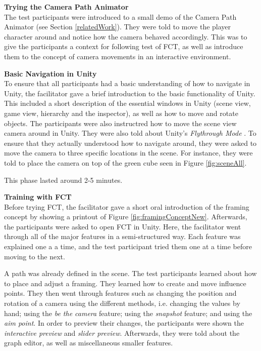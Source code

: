 \textbf{Trying the Camera Path Animator}\\
The test participants were introduced to a small demo of the Camera Path Animator \cite{unity_camTool} (see Section \ref{relatedWork}). They were told to move the player character around and notice how the camera behaved accordingly. This was to give the participants a context for following test of FCT, as well as introduce them to the concept of camera movements in an interactive environment.




\textbf{Basic Navigation in Unity}\\
To ensure that all participants had a basic understanding of how to navigate in Unity, the facilitator gave a brief introduction to the basic functionality of Unity. This included a short description of the essential windows in Unity (scene view, game view, hierarchy and the inspector), as well as how to move and rotate objects. The participants were also instructred how to move the scene view camera around in Unity. They were also told about Unity's \textit{Flythrough Mode} \cite{unity_flyMode}. To ensure that they actually understood how to navigate around, they were asked to move the camera to three specific locations in the scene. For instance, they were told to place the camera on top of the green cube seen in Figure \ref{fig:sceneAll}.

This phase lasted around 2-5 minutes.

\textbf{Training with FCT}\\
Before trying FCT, the facilitator gave a short oral introduction of the framing concept by showing a printout of Figure \ref{fig:framingConceptNew}. Afterwards, the participants were asked to open FCT in Unity. Here, the facilitator went through all of the major features in a semi-structured way. Each feature was explained one a a time, and the test participant tried them one at a time before moving to the next.

A path was already defined in the scene. The test participants learned about how to place and adjust a framing. They learned how to create and move influence points. They then went through features such as changing the position and rotation of a camera using the different methods, i.e. changing the values by hand; using the \textit{be the camera} feature; using the \textit{snapshot} feature; and using the \textit{aim point}. In order to preview their changes, the participants were shown the \textit{interactive preview} and \textit{slider preview}. Afterwards, they were told about the graph editor, as well as miscellaneous smaller features.

